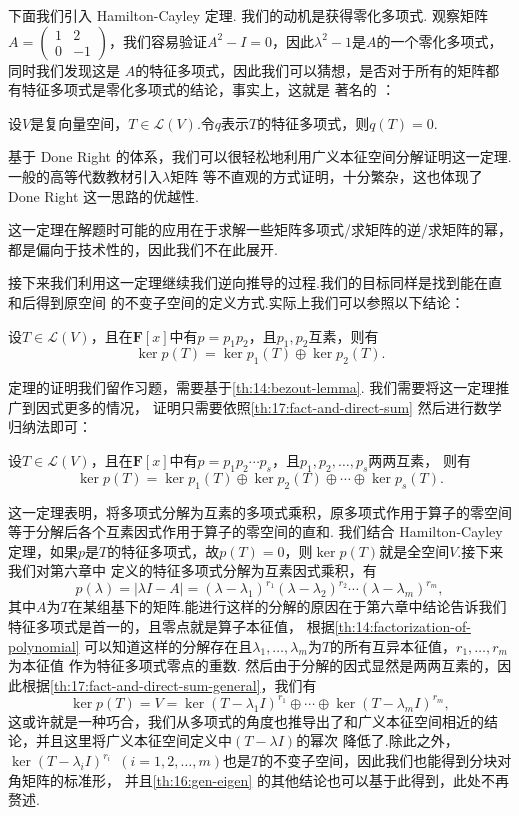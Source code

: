 下面我们引入 Hamilton-Cayley 定理. 我们的动机是获得零化多项式. 观察矩阵$A=\begin{pmatrix}
    1 & 2 \\ 0 & -1
\end{pmatrix}$，我们容易验证$A^2-I=0$，因此$\lambda^2-1$是$A$的一个零化多项式，同时我们发现这是
$A$的特征多项式，因此我们可以猜想，是否对于所有的矩阵都有特征多项式是零化多项式的结论，事实上，这就是
著名的 ：
\begin{theorem} \label{th:17:HC}
    设$V$是复向量空间，$T\in \mathcal{L}(V)$.令$q$表示$T$的特征多项式，则$q(T)=0$.
\end{theorem}
基于 Done Right 的体系，我们可以很轻松地利用广义本征空间分解证明这一定理.一般的高等代数教材引入$\lambda$矩阵
等不直观的方式证明，十分繁杂，这也体现了 Done Right 这一思路的优越性.

这一定理在解题时可能的应用在于求解一些矩阵多项式/求矩阵的逆/求矩阵的幂，都是偏向于技术性的，因此我们不在此展开.

接下来我们利用这一定理继续我们逆向推导的过程.我们的目标同样是找到能在直和后得到原空间
的不变子空间的定义方式.实际上我们可以参照以下结论：
\begin{theorem} \label{th:17:fact-and-direct-sum} %
    设$T\in \mathcal{L}(V)$，且在$\mathbf{F}[x]$中有$p=p_1p_2$，且$p_1,p_2$互素，则有
    \[\ker p(T)=\ker p_1(T)\oplus\ker p_2(T).\]
\end{theorem}
定理的证明我们留作习题，需要基于\autoref{th:14:bezout-lemma}. 我们需要将这一定理推广到因式更多的情况，
证明只需要依照\autoref{th:17:fact-and-direct-sum} 然后进行数学归纳法即可：
\begin{theorem} \label{th:17:fact-and-direct-sum-general}
    设$T\in \mathcal{L}(V)$，且在$\mathbf{F}[x]$中有$p=p_1p_2\cdots p_s$，且$p_1,p_2,\ldots,p_s$两两互素，
    则有\[\ker p(T)=\ker p_1(T)\oplus\ker p_2(T)\oplus\cdots\oplus\ker p_s(T).\]
\end{theorem}
这一定理表明，将多项式分解为互素的多项式乘积，原多项式作用于算子的零空间等于分解后各个互素因式作用于算子的零空间的直和.
我们结合 Hamilton-Cayley 定理，如果$p$是$T$的特征多项式，故$p(T)=0$，则$\ker p(T)$就是全空间$V$.接下来我们对第六章中
定义的特征多项式分解为互素因式乘积，有
\[p(\lambda)=|\lambda I-A|=(\lambda-\lambda_1)^{r_1}(\lambda-\lambda_2)^{r_2}\cdots(\lambda-\lambda_m)^{r_m},\]
其中$A$为$T$在某组基下的矩阵.能进行这样的分解的原因在于第六章中结论告诉我们特征多项式是首一的，且零点就是算子本征值，
根据\autoref{th:14:factorization-of-polynomial} 可以知道这样的分解存在且$\lambda_1,\ldots,\lambda_m$为$T$的所有互异本征值，$r_1,\ldots,r_m$为本征值
作为特征多项式零点的重数. 然后由于分解的因式显然是两两互素的，因此根据\autoref{th:17:fact-and-direct-sum-general}，我们有
\[\ker p(T)=V=\ker (T-\lambda_1I)^{r_1}\oplus\cdots\oplus\ker (T-\lambda_mI)^{r_m},\]
这或许就是一种巧合，我们从多项式的角度也推导出了和广义本征空间相近的结论，并且这里将广义本征空间定义中$(T-\lambda I)$的幂次
降低了.除此之外，$\ker (T-\lambda_iI)^{r_i}\enspace(i=1,2,\ldots,m)$也是$T$的不变子空间，因此我们也能得到分块对角矩阵的标准形，
并且\autoref{th:16:gen-eigen} 的其他结论也可以基于此得到，此处不再赘述.

